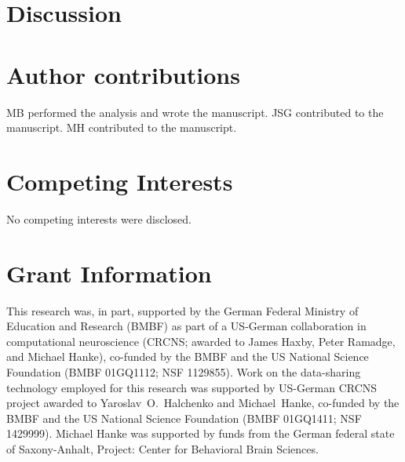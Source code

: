 
\section*{Discussion}





\section*{Author contributions}

MB performed the analysis and wrote the manuscript.
JSG contributed to the manuscript.
MH contributed to the manuscript.


\section*{Competing Interests}
No competing interests were disclosed.

\section*{Grant Information}

This research was, in part, supported by the German Federal Ministry of
Education and Research (BMBF) as part of a US-German collaboration in
computational neuroscience (CRCNS; awarded to James Haxby, Peter Ramadge, and
Michael Hanke), co-funded by the BMBF and the US National Science Foundation
(BMBF 01GQ1112; NSF 1129855).  Work on the data-sharing technology employed for
this research was supported by US-German CRCNS project awarded to
Yaroslav~O.~Halchenko and Michael~Hanke, co-funded by the BMBF and the US
National Science Foundation (BMBF 01GQ1411; NSF 1429999).  Michael Hanke was
supported by funds from the German federal state of Saxony-Anhalt, Project:
Center for Behavioral Brain Sciences.


